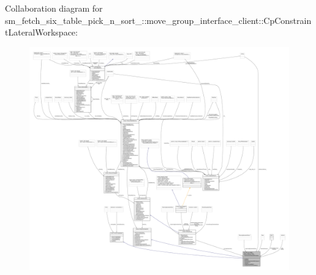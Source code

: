 Collaboration diagram for sm\+\_\+fetch\+\_\+six\+\_\+table\+\_\+pick\+\_\+n\+\_\+sort\+\_\+:\+:move\+\_\+group\+\_\+interface\+\_\+client\+:\+:Cp\+Constraint\+Lateral\+Workspace\+:
\nopagebreak
\begin{figure}[H]
\begin{center}
\leavevmode
\includegraphics[width=350pt]{classsm__fetch__six__table__pick__n__sort__1_1_1move__group__interface__client_1_1CpConstraintLateralWorkspace__coll__graph}
\end{center}
\end{figure}
